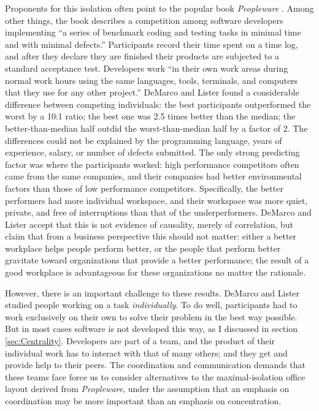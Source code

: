 Proponents for this isolation often point to the popular book \emph{Peopleware} \cite{DeMarco1987}. Among other things, the book describes a competition among software developers implementing ``a series of benchmark coding and testing tasks in minimal time and with minimal defects.'' Participants record their time spent on a time log, and after they declare they are finished their products are subjected to a standard acceptance test. Developers work ``in their own work areas during normal work hours using the same languages, tools, terminals, and computers that they use for any other project.'' DeMarco and Lister found a considerable difference between competing individuals: the best participants outperformed the worst by a 10:1 ratio; the best one was 2.5 times better than the median; the better-than-median half outdid the worst-than-median half by a factor of 2. The differences could not be explained by the programming language, years of experience, salary, or number of defects submitted. The only strong predicting factor was where the participants worked: high performance competitors often came from the same companies, and their companies had better environmental factors than those of low performance competitors. Specifically, the better performers had more individual workspace, and their workspace was more quiet, private, and free of interruptions than that of the underperformers. DeMarco and Lister accept that this is not evidence of causality, merely of correlation, but claim that from a business perspective this should not matter: either a better workplace helps people perform better, or the people that perform better gravitate toward organizations that provide a better performance; the result of a good workplace is advantageous for these organizations no matter the rationale.

However, there is an important challenge to these results. DeMarco and Lister studied people working on a task \emph{individually}. To do well, participants had to work exclusively on their own to solve their problem in the best way possible. But in most cases software is not developed this way, as I discussed in section \ref{sec:Centrality}. Developers are part of a team, and the product of their individual work has to interact with that of many others; and they get and provide help to their peers. The coordination and communication demands that these teams face force us to consider alternatives to the maximal-isolation office layout derived from \emph{Peopleware}, under the assumption that an emphasis on coordination may be more important than an emphasis on concentration.


